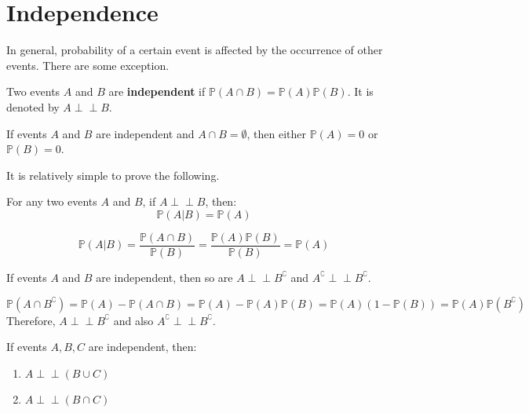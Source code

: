 \documentclass{huhtakm-template-book}
\newcommand{\independent}{\perp\!\!\!\perp}
\newcommand{\prob}{\mathbb{P}}
\begin{document}
\section{Independence}
In general, probability of a certain event is affected by the occurrence of other events. There are some exception.
\begin{defn}
	Two events $A$ and $B$ are \textbf{independent} if $\prob(A\cap B)=\prob(A)\prob(B)$. It is denoted by $A\independent B$.
\end{defn}
\begin{rem}
	If events $A$ and $B$ are independent and $A\cap B=\emptyset$, then either $\prob(A)=0$ or $\prob(B)=0$.
\end{rem}
It is relatively simple to prove the following.
\begin{lem}
	For any two events $A$ and $B$, if $A\independent B$, then:
	\begin{equation*}
		\prob(A|B)=\prob(A)
	\end{equation*}
\end{lem}
\begin{proofing}
	\begin{equation*}
		\prob(A|B)=\frac{\prob(A\cap B)}{\prob(B)}=\frac{\prob(A)\prob(B)}{\prob(B)}=\prob(A)
	\end{equation*}
\end{proofing}
\begin{prop}
	If events $A$ and $B$ are independent, then so are $A\independent B^{\complement}$ and $A^{\complement}\independent B^{\complement}$.
\end{prop}
\begin{proofing}
	\begin{equation*}
		\prob(A\cap B^{\complement})=\prob(A)-\prob(A\cap B)=\prob(A)-\prob(A)\prob(B)=\prob(A)(1-\prob(B))=\prob(A)\prob(B^{\complement})
	\end{equation*}
	Therefore, $A\independent B^{\complement}$ and also $A^{\complement}\independent B^{\complement}$.
\end{proofing}
\begin{prop}
	If events $A,B,C$ are independent, then:
	\begin{enumerate}
		\item $A\independent(B\cup C)$
		\item $A\independent(B\cap C)$
	\end{enumerate}
\end{prop}
\end{document}
